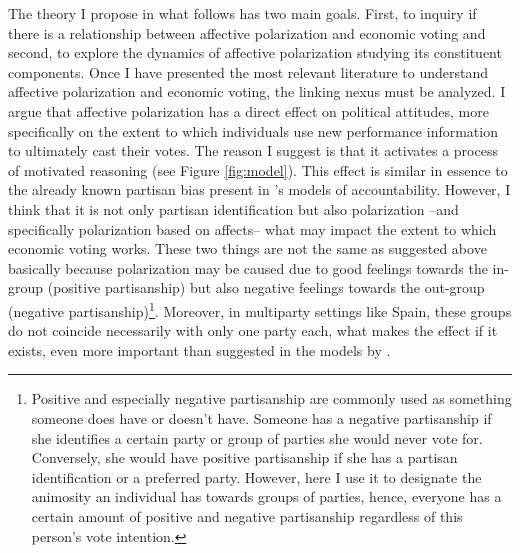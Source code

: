 \documentclass[a4paper, svgnames]{article}
\begin{document}
\label{section:theory}
The theory I propose in what follows has two main goals. First, to inquiry if there is a relationship between affective polarization and economic voting and second, to explore the dynamics of affective polarization studying its constituent components. Once I have presented the most relevant literature to understand affective polarization and economic voting, the linking nexus must be analyzed. I argue that affective polarization has a direct effect on political attitudes, more specifically on the extent to which individuals use new performance information to ultimately cast their votes. The reason I suggest is that it activates a process of motivated reasoning (see Figure \ref{fig:model}). This effect is similar in essence to the already known partisan bias present in  \citet*{tilleyGovernmentBlameExperimental2011a}'s models of accountability. However, I think that it is not only partisan identification but also polarization --and specifically polarization based on affects-- what may impact the extent to which economic voting works. These two things are not the same as suggested above basically because polarization may be caused due to good feelings towards the in-group (positive partisanship) but also negative feelings towards the out-group (negative partisanship)\footnote{Positive and especially negative partisanship are commonly used as something someone does have or doesn't have. Someone has a negative partisanship if she identifies a certain party or group of parties she would never vote for. Conversely, she would have positive partisanship if she has a partisan identification or a preferred party. However, here I use it to designate the animosity an individual has towards groups of parties, hence, everyone has a certain amount of positive and negative partisanship regardless of this person's vote intention.}. Moreover, in multiparty settings like Spain, these groups do not coincide necessarily with only one party each, what makes the effect if it exists, even more important than suggested in the models by \citet*{tilleyGovernmentBlameExperimental2011a}.
\end{document}
